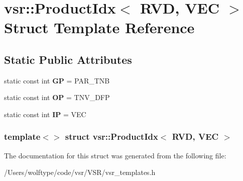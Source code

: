 \hypertarget{structvsr_1_1_product_idx_3_01_r_v_d_00_01_v_e_c_01_4}{\section{vsr\-:\-:Product\-Idx$<$ R\-V\-D, V\-E\-C $>$ Struct Template Reference}
\label{structvsr_1_1_product_idx_3_01_r_v_d_00_01_v_e_c_01_4}
}
\subsection*{Static Public Attributes}
\begin{DoxyCompactItemize}
\item 
\hypertarget{structvsr_1_1_product_idx_3_01_r_v_d_00_01_v_e_c_01_4_acfc9c4185f24b0c19b05dcdc4005400e}{static const int {\bfseries G\-P} = P\-A\-R\-\_\-\-T\-N\-B}\label{structvsr_1_1_product_idx_3_01_r_v_d_00_01_v_e_c_01_4_acfc9c4185f24b0c19b05dcdc4005400e}

\item 
\hypertarget{structvsr_1_1_product_idx_3_01_r_v_d_00_01_v_e_c_01_4_acf3c9deb55ad6dfdc8cafc1bfea273a9}{static const int {\bfseries O\-P} = T\-N\-V\-\_\-\-D\-F\-P}\label{structvsr_1_1_product_idx_3_01_r_v_d_00_01_v_e_c_01_4_acf3c9deb55ad6dfdc8cafc1bfea273a9}

\item 
\hypertarget{structvsr_1_1_product_idx_3_01_r_v_d_00_01_v_e_c_01_4_ad0d3efeedd8917913d5da3fb482e7ac1}{static const int {\bfseries I\-P} = V\-E\-C}\label{structvsr_1_1_product_idx_3_01_r_v_d_00_01_v_e_c_01_4_ad0d3efeedd8917913d5da3fb482e7ac1}

\end{DoxyCompactItemize}
\subsubsection*{template$<$$>$ struct vsr\-::\-Product\-Idx$<$ R\-V\-D, V\-E\-C $>$}



The documentation for this struct was generated from the following file\-:\begin{DoxyCompactItemize}
\item 
/\-Users/wolftype/code/vsr/\-V\-S\-R/vsr\-\_\-templates.\-h\end{DoxyCompactItemize}
